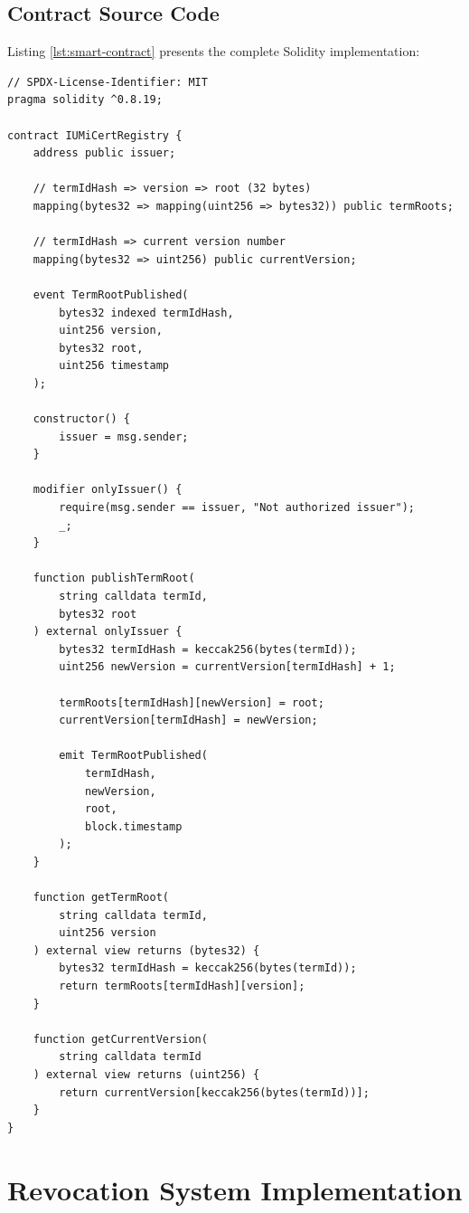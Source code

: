 \subsection{Contract Source Code}
\label{subsec:contract-code}

Listing \ref{lst:smart-contract} presents the complete Solidity implementation:

\begin{lstlisting}[language=Solidity, caption=IUMiCertRegistry Smart Contract, label=lst:smart-contract]
// SPDX-License-Identifier: MIT
pragma solidity ^0.8.19;

contract IUMiCertRegistry {
    address public issuer;

    // termIdHash => version => root (32 bytes)
    mapping(bytes32 => mapping(uint256 => bytes32)) public termRoots;

    // termIdHash => current version number
    mapping(bytes32 => uint256) public currentVersion;

    event TermRootPublished(
        bytes32 indexed termIdHash,
        uint256 version,
        bytes32 root,
        uint256 timestamp
    );

    constructor() {
        issuer = msg.sender;
    }

    modifier onlyIssuer() {
        require(msg.sender == issuer, "Not authorized issuer");
        _;
    }

    function publishTermRoot(
        string calldata termId,
        bytes32 root
    ) external onlyIssuer {
        bytes32 termIdHash = keccak256(bytes(termId));
        uint256 newVersion = currentVersion[termIdHash] + 1;

        termRoots[termIdHash][newVersion] = root;
        currentVersion[termIdHash] = newVersion;

        emit TermRootPublished(
            termIdHash,
            newVersion,
            root,
            block.timestamp
        );
    }

    function getTermRoot(
        string calldata termId,
        uint256 version
    ) external view returns (bytes32) {
        bytes32 termIdHash = keccak256(bytes(termId));
        return termRoots[termIdHash][version];
    }

    function getCurrentVersion(
        string calldata termId
    ) external view returns (uint256) {
        return currentVersion[keccak256(bytes(termId))];
    }
}
\end{lstlisting}

\section{Revocation System Implementation}
\label{sec:revocation-impl}

